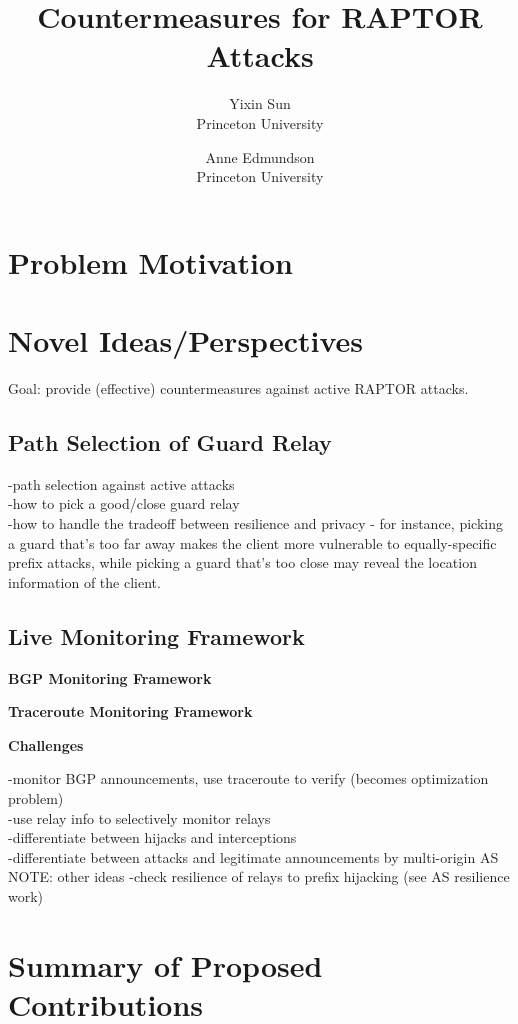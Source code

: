 \documentclass{acm_proc_article-sp}
\begin{document}
\date{}

\title{\Large \bf Countermeasures for RAPTOR Attacks}
\author{
 {\rm Yixin Sun}\\
 Princeton University
 \and
 {\rm Anne Edmundson}\\
 Princeton University
} %

\maketitle


\section{Problem Motivation}
\cite{sun2015raptor}

\section{Novel Ideas/Perspectives}
Goal: provide (effective) countermeasures against active RAPTOR attacks.

\subsection{Path Selection of Guard Relay}
-path selection against active attacks\\
-how to pick a good/close guard relay\\
-how to handle the tradeoff between resilience and privacy - for instance, picking a guard that's too far away makes the client more vulnerable to equally-specific prefix attacks, while picking a guard that's too close may reveal the location information of the client. 

\subsection{Live Monitoring Framework}
{\bf BGP Monitoring Framework}

{\bf Traceroute Monitoring Framework}

{\bf Challenges}

-monitor BGP announcements, use traceroute to verify (becomes optimization problem)\\
-use relay info to selectively monitor relays\\
-differentiate between hijacks and interceptions\\
-differentiate between attacks and legitimate announcements by multi-origin AS\\

NOTE: other ideas
-check resilience of relays to prefix hijacking (see AS resilience work)

\section{Summary of Proposed Contributions}

{\footnotesize 
}

\end{document}
